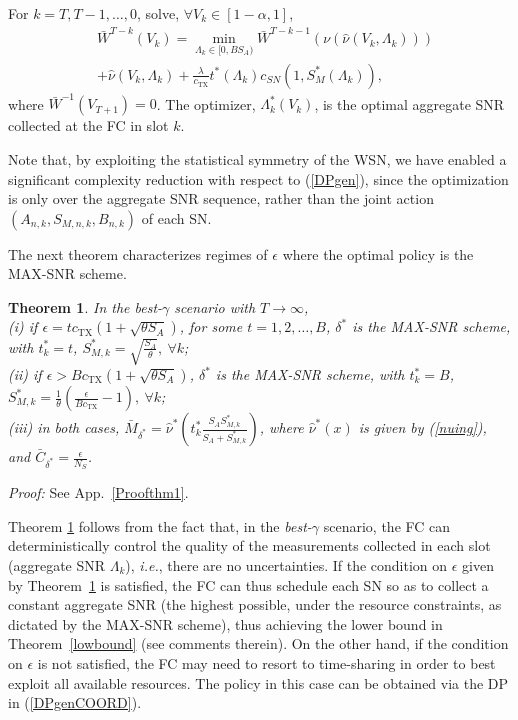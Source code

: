 \documentclass[10pt,twocolumn,twoside]{IEEEtran}
\newtheorem{thm}{Theorem}
\theoremstyle{plain}
\newcommand{\nn}{\nonumber}
\begin{document}
 For $k=T,T-1,\dots,0$, solve, $\forall V_k{\in}[1-\alpha,1]$,
  \begin{align}\label{DPgenCOORD}
  \nn
&\bar W^{T-k}(V_{k})
=\!\!\!\!\min_{\Lambda_k\in [0,BS_A)}
\bar W^{T-k-1}(\nu(\hat \nu(V_{k},\Lambda_{k})))
\\&
+\hat \nu(V_{k},\Lambda_k)
+\frac{\lambda}{c_{\mathrm{TX}}} t^*(\Lambda_k)c_{SN}\left(1,S_{M}^*(\Lambda_k)\right),
\end{align}
where $\bar W^{-1}(V_{T+1})=0$. The optimizer, $\Lambda_k^*(V_k)$, is the optimal aggregate SNR collected at the FC in slot $k$.
\hfill\QED

Note that, by exploiting the statistical symmetry of the WSN, we have enabled a significant complexity reduction with respect to 
 (\ref{DPgen}), since the optimization is only over the aggregate SNR sequence, rather than the joint action $(A_{n,k},S_{M,n,k},B_{n,k})$ of each SN.
 
The next theorem characterizes regimes of $\epsilon$ where the optimal policy is the MAX-SNR scheme.
\begin{thm}
 \label{thm1}
In the \emph{best-}$\gamma$ scenario with $T\to\infty$,
\\(i) if $\epsilon=tc_{\mathrm{TX}}(1+\sqrt{\theta S_A})$, for some $t=1,2,\dots,B$,
 $\delta^*$ is the MAX-SNR scheme, 
with $t_k^*=t$, $S_{M,k}^*=\sqrt{\frac{S_A}{\theta}},\ \forall k$;
\\(ii) if $\epsilon>Bc_{\mathrm{TX}}(1+\sqrt{\theta S_A})$,
 $\delta^*$ is the MAX-SNR scheme, 
with $t_k^*=B$, $S_{M,k}^*=\frac{1}{\theta}\left(\frac{\epsilon}{Bc_{\mathrm{TX}}}-1\right),\ \forall k$;
\\(iii) in both cases,  $\bar M_{\delta^*}=\hat\nu^*\left(t_k^*\frac{S_AS_{M,k}^*}{S_A+S_{M,k}^*}\right)$, where $\hat\nu^*(x)$ is given by (\ref{nuing}),
and $\bar C_{\delta^*}=\frac{\epsilon}{N_S}$.
\end{thm}
\noindent\emph{Proof:}
See App.~\ref{Proofthm1}.
\hfill\QED

Theorem \ref{thm1} follows from the fact that, in the \emph{best-}$\gamma$ scenario, the FC can deterministically control the quality of the measurements 
collected in each slot (aggregate SNR $\Lambda_k$), \emph{i.e.}, there are no uncertainties. If the condition on
 $\epsilon$ given by Theorem~\ref{thm1} is satisfied, the FC can thus schedule each SN so as to collect a constant aggregate SNR (the highest possible, under the resource constraints, as dictated by the MAX-SNR scheme), thus achieving the lower bound in Theorem~\ref{lowbound} (see comments therein).
 On the other hand, if the condition on $\epsilon$ is not satisfied, the FC may need to resort to time-sharing in order to best exploit all available resources. The policy
  in this case can be obtained via the DP in (\ref{DPgenCOORD}).
 
\end{document}
